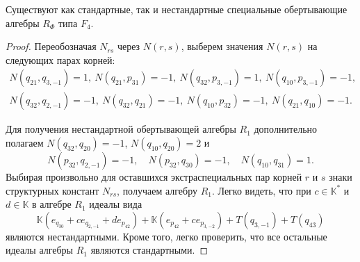 \documentclass[a4paper,14pt,oneside,openany]{memoir}
\begin{document}
\begin{theorem}\label{th:stand-f4}
    Существуют как стандартные, так и нестандартные специальные обертывающие
    алгебры $R_\Phi$ типа $F_4$.
\end{theorem}
\begin{proof}
    Переобозначая $N_{rs}$ через $N(r,s)$, выберем значения $N(r,s)$ на следующих
    парах корней:
    \begin{equation}\label{eq:StructConst-Stand-F4}
        \begin{gathered}
            N(q_{21},q_{3,-1}) = 1,\ N(q_{21},p_{31}) = -1, \
            N(q_{32},p_{3,-1}) = 1, \ N(q_{10},p_{3,-1}) = -1, \\
            N(q_{32},q_{2,-1}) = -1, \ N(q_{32},q_{21}) = -1, \ N(q_{10},p_{32}) = -1, \
            N(q_{21},q_{10}) = -1.
        \end{gathered}
    \end{equation}

    Для получения нестандартной обертывающей алгебры $R_1$ дополнительно полагаем
    $N(q_{32},q_{20}) = -1$, $N(q_{10},q_{20}) = 2$ и
    \[
        N(p_{32},q_{2,-1}) = -1,\quad N(p_{32},q_{30}) = -1,\quad N(q_{10},q_{31}) = 1.
    \]
    Выбирая произвольно для оставшихся экстраспециальных пар корней $r$ и $s$ знаки
    структурных констант $N_{rs}$, получаем алгебру $R_1$. Легко видеть, что при
    $c\in\mathbb{K}^*$ и $d\in\mathbb{K}$ в алгебре $R_1$ идеалы вида
    \begin{equation*}%
        \mathbb{K}(e_{q_{30}} + ce_{q_{2,-1}} + de_{p_{42}}) +
        \mathbb{K}(e_{p_{42}} + ce_{p_{3,-2}}) + T(q_{3,-1}) + T(q_{43})
    \end{equation*}
    являются нестандартными. Кроме того, легко проверить, что все остальные
    идеалы алгебры $R_1$ являются стандартными.

    \medskip


\end{proof}
\end{document}
